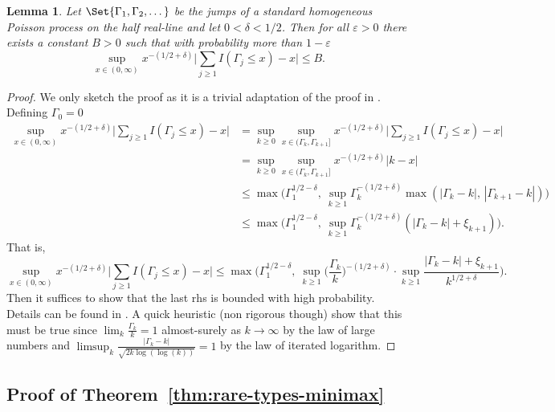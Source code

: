 \documentclass{article}
\newtheorem{lemma}{Lemma}
\newcommand{\1}{\boldsymbol{1}}
\theoremstyle{plain}
\begin{document}
\begin{lemma}
  \label{lem:poissoncdf}
  Let $\Set{\Gamma_1,\Gamma_2,\dots}$ be the jumps of a standard homogeneous Poisson process on the half real-line and let $0 < \delta < 1/2$. Then for all $\varepsilon > 0$ there exists a constant $B > 0$ such that with probability more than $1 - \varepsilon$
  \begin{equation*}
    \sup_{x\in (0,\infty)} x^{-(1/2 + \delta)}\Big| \sum_{j\geq 1}I(\Gamma_j \leq x) - x\Big| \leq B.
  \end{equation*}
\end{lemma}
\begin{proof}
  We only sketch the proof as it is a trivial adaptation of the proof in \cite[Lemma~B.1]{Fav(22)}. Defining $\Gamma_0 = 0$
  \begin{align*}
    \sup_{x\in (0,\infty)} x^{-(1/2 + \delta)}\Big| \sum_{j\geq 1}I(\Gamma_j \leq x) - x\Big|%
    &= \sup_{k\geq 0}\sup_{x\in (\Gamma_k,\Gamma_{k+1}]} x^{-(1/2 + \delta)}\Big| \sum_{j\geq 1}I(\Gamma_j \leq x) - x\Big|\\
    &= \sup_{k\geq 0}\sup_{x\in (\Gamma_k,\Gamma_{k+1}]} x^{-(1/2 + \delta)}| k - x|\\
    &\leq \max\Big(\Gamma_1^{1/2 - \delta},\ \sup_{k\geq 1}\Gamma_k^{-(1/2+\delta)}\max(|\Gamma_{k} - k|,\,|\Gamma_{k+1} - k|) \Big)\\
    &\leq \max\Big(\Gamma_1^{1/2-\delta},\ \sup_{k\geq 1}\Gamma_k^{-(1/2+\delta)}(|\Gamma_{k} - k| + \xi_{k+1}) \Big).
  \end{align*}
  That is,
  \begin{equation*}
    \sup_{x\in (0,\infty)} x^{-(1/2 + \delta)}\Big| \sum_{j\geq 1}I(\Gamma_j \leq x) - x\Big|%
    \leq \max\Bigg(\Gamma_1^{1/2-\delta},\ \sup_{k\geq 1}\Big(\frac{\Gamma_k}{k}\Big)^{-(1/2+\delta)}\cdot\sup_{k\geq 1}\frac{|\Gamma_{k} - k| + \xi_{k+1}}{k^{1/2+\delta}} \Bigg).
  \end{equation*}
  Then it suffices to show that the last rhs is bounded with high probability. Details can be found in \cite[Lemma~B.1]{Fav(22)}. A quick heuristic (non rigorous though) show that this must be true since $\lim_k\frac{\Gamma_k}{k} = 1$ almost-surely as $k\to \infty$ by the law of large numbers and $\limsup_k\frac{|\Gamma_k - k|}{\sqrt{2k\log(\log(k))}} = 1$ by the law of iterated logarithm.
\end{proof}


\subsection{Proof of Theorem~\ref{thm:rare-types-minimax}}
\label{sec:proof-theorem-rare-types-minimax}
\end{document}
